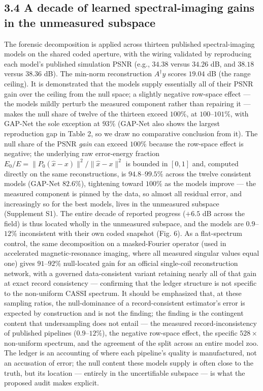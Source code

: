 \documentclass[11pt]{article}
\begin{document}
\subsection*{3.4 A decade of learned spectral-imaging gains in the unmeasured subspace}

The forensic decomposition is applied across thirteen published spectral-imaging models on the shared coded aperture, with the wiring validated by reproducing each model's published simulation PSNR (e.g., $34.38$ versus $34.26$ dB, and $38.18$ versus $38.36$ dB). The min-norm reconstruction $A^{\dagger}y$ scores $19.04$ dB (the range ceiling). It is demonstrated that the models supply essentially all of their PSNR gain over the ceiling from the null space; a slightly negative row-space effect --- the models mildly perturb the measured component rather than repairing it --- makes the null share of twelve of the thirteen exceed $100\%$, at $100$--$101\%$, with GAP-Net the sole exception at $93\%$ (GAP-Net also shows the largest reproduction gap in Table 2, so we draw no comparative conclusion from it). The null share of the PSNR \textit{gain} can exceed $100\%$ because the row-space effect is negative; the underlying raw error-energy fraction $E_0/E = \|P_0(\hat{x}-x)\|^2/\|\hat{x}-x\|^2$ is bounded in $[0,1]$ and, computed directly on the same reconstructions, is $94.8$--$99.5\%$ across the twelve consistent models (GAP-Net $82.6\%$), tightening toward $100\%$ as the models improve --- the measured component is pinned by the data, so almost all residual error, and increasingly so for the best models, lives in the unmeasured subspace (Supplement S1). The entire decade of reported progress ($+6.5$ dB across the field) is thus located wholly in the unmeasured subspace, and the models are $0.9$--$12\%$ inconsistent with their own coded snapshot (Fig. 6). As a flat-spectrum control, the same decomposition on a masked-Fourier operator (used in accelerated magnetic-resonance imaging, where all measured singular values equal one) gives $91$--$92\%$ null-located gain for an official single-coil reconstruction network, with a governed data-consistent variant retaining nearly all of that gain at exact record consistency --- confirming that the ledger structure is not specific to the non-uniform CASSI spectrum. It should be emphasized that, at these sampling ratios, the null-dominance of a record-consistent estimator's error is expected by construction and is not the finding; the finding is the contingent content that undersampling does not entail --- the measured record-inconsistency of published pipelines ($0.9$--$12\%$), the negative row-space effect, the specific $528\times$ non-uniform spectrum, and the agreement of the split across an entire model zoo. The ledger is an accounting of where each pipeline's quality is manufactured, not an accusation of error; the null content these models supply is often close to the truth, but its location --- entirely in the uncertifiable subspace --- is what the proposed audit makes explicit.
\end{document}

